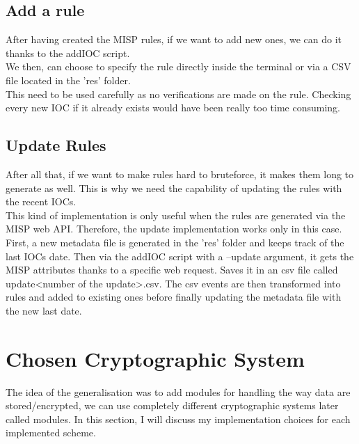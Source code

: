 \documentclass{eplmastersthesis}
\begin{document}
\subsection{Add a rule}
After having created the MISP rules, if we want to add new ones, we can do it thanks to the addIOC script.\\
We then, can choose to specify the rule directly inside the terminal or via a CSV file located in the 'res' folder.\\
This need to be used carefully as no verifications are made on the rule. Checking every new IOC if it already exists would have been really too time consuming.

\subsection{Update Rules}
After all that, if we want to make rules hard to bruteforce, it makes them long to generate as well. This is why we need the capability of updating the rules with the recent IOCs.\\
This kind of implementation is only useful when the rules are generated via the MISP web API. Therefore, the update implementation works only in this case.\\
First, a new metadata file is generated in the 'res' folder and keeps track of the last IOCs date. Then via the addIOC script with a --update argument, it gets the MISP attributes thanks to a specific web request. Saves it in an csv file called update<number of the update>.csv.
The csv events are then transformed into rules and added to existing ones before finally updating the metadata file with the new last date.

\section{Chosen Cryptographic System}
The idea of the generalisation was to add modules for handling the way data are stored/encrypted, we can use completely different cryptographic systems later called modules. In this section, I will discuss my implementation choices for each implemented scheme.
\end{document}
